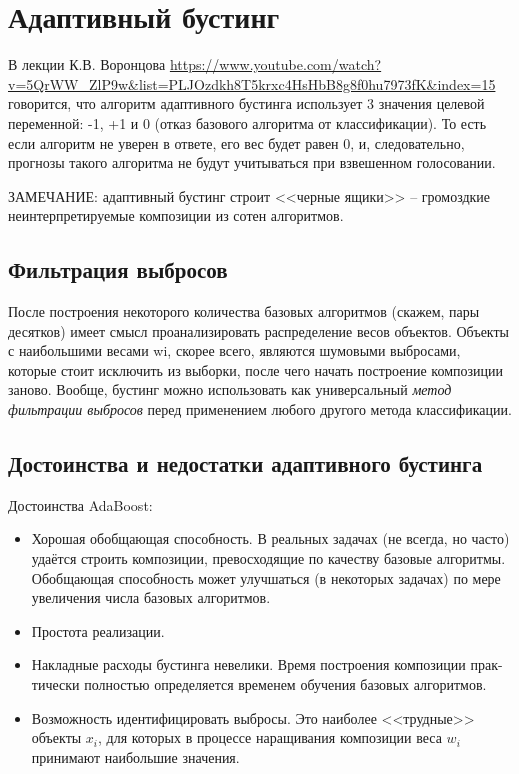 \documentclass[%
	11pt,
	a4paper,
	utf8,
		]{article}
\begin{document}
\section{Адаптивный бустинг}

В лекции К.В. Воронцова \url{https://www.youtube.com/watch?v=5QrWW_ZlP9w&list=PLJOzdkh8T5krxc4HsHbB8g8f0hu7973fK&index=15} говорится, что алгоритм адаптивного бустинга использует 3 значения целевой переменной: -1, +1 и 0 (отказ базового алгоритма от классификации). То есть если алгоритм не уверен в ответе, его вес будет равен 0, и, следовательно, прогнозы такого алгоритма не будут учитываться при взвешенном голосовании.

ЗАМЕЧАНИЕ: адаптивный бустинг строит <<черные ящики>> -- громоздкие неинтерпретируемые композиции из сотен алгоритмов.

\subsection{Фильтрация выбросов}

После построения некоторого количества базовых алгоритмов (скажем, пары десятков) имеет смысл проанализировать распределение весов объектов. Объекты с наибольшими весами wi, скорее всего, являются шумовыми выбросами, которые стоит исключить из выборки, после чего начать построение композиции заново. Вообще, бустинг можно использовать как универсальный \emph{метод фильтрации выбросов} перед применением любого другого метода классификации.

\subsection{Достоинства и недостатки адаптивного бустинга}

Достоинства AdaBoost:
\begin{itemize}
	\item Хорошая обобщающая способность. В реальных задачах (не всегда, но часто)
	удаётся строить композиции, превосходящие по качеству базовые алгоритмы.
	Обобщающая способность может улучшаться (в некоторых задачах) по мере
	увеличения числа базовых алгоритмов.
	
	\item Простота реализации.
	
	\item Накладные расходы бустинга невелики. Время построения композиции прак-
	тически полностью определяется временем обучения базовых алгоритмов.
	
	\item Возможность идентифицировать выбросы. Это наиболее <<трудные>> объекты $ x_i $,
	для которых в процессе наращивания композиции веса $ w_i $ принимают наибольшие значения.
\end{itemize}
\end{document}
